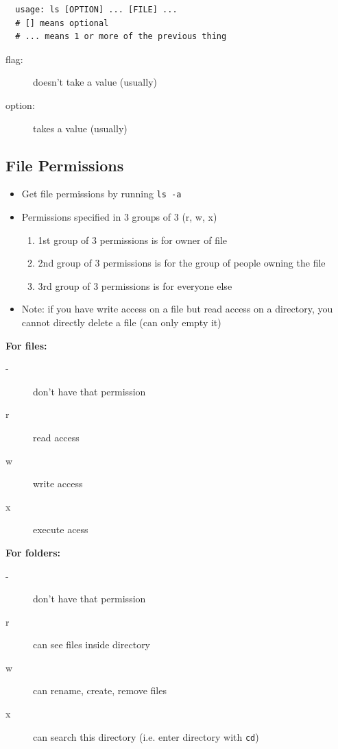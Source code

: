 \documentclass[letterpaper,12pt]{article}
\begin{document}
\begin{lstlisting}
  usage: ls [OPTION] ... [FILE] ...
  # [] means optional
  # ... means 1 or more of the previous thing
\end{lstlisting}

\begin{description}
 \item[flag:] doesn't take a value (usually)
 \item[option:] takes a value (usually)
\end{description}

\subsection{File Permissions}
\begin{itemize}
 \item Get file permissions by running \lstinline{ls -a}
 \item Permissions specified in 3 groups of 3 (r, w, x)
       \begin{enumerate}
        \item 1st group of 3 permissions is for owner of file
        \item 2nd group of 3 permissions is for the group of people owning the file
        \item 3rd group of 3 permissions is for everyone else
       \end{enumerate}
 \item Note: if you have write access on a file but read access on a directory, you cannot directly delete a file (can only empty it)
\end{itemize}

\textbf{For files:}
\begin{description}
 \item[-] don't have that permission
 \item[r] read access
 \item[w] write access
 \item[x] execute acess
\end{description}

\textbf{For folders:}
\begin{description}
 \item[-] don't have that permission
 \item[r] can see files inside directory
 \item[w] can rename, create, remove files
 \item[x] can search this directory (i.e. enter directory with \lstinline{cd})
\end{description}
\end{document}
